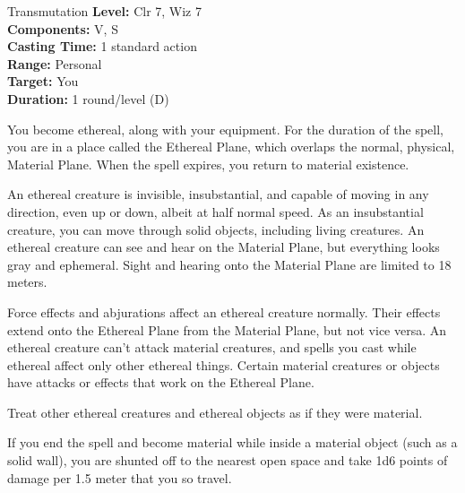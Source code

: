 {Transmutation}
{
	\textbf{Level:}
	Clr 7, Wiz 7\\
	\textbf{Components:}
	V, S\\
	\textbf{Casting Time:}
	1 standard action\\
	\textbf{Range:}
	Personal\\
	\textbf{Target:}
	You\\
	\textbf{Duration:}
	1 round/level (D)\\
}
{
	You become ethereal, along with your equipment. For the duration of the spell, you are in a place called the Ethereal Plane, which overlaps the normal, physical, Material Plane. When the spell expires, you return to material existence.

	An ethereal creature is invisible, insubstantial, and capable of moving in any direction, even up or down, albeit at half normal speed. As an insubstantial creature, you can move through solid objects, including living creatures. An ethereal creature can see and hear on the Material Plane, but everything looks gray and ephemeral. Sight and hearing onto the Material Plane are limited to 18 meters.

	Force effects and abjurations affect an ethereal creature normally. Their effects extend onto the Ethereal Plane from the Material Plane, but not vice versa. An ethereal creature can't attack material creatures, and spells you cast while ethereal affect only other ethereal things. Certain material creatures or objects have attacks or effects that work on the Ethereal Plane.

	Treat other ethereal creatures and ethereal objects as if they were material.

	If you end the spell and become material while inside a material object (such as a solid wall), you are shunted off to the nearest open space and take 1d6 points of damage per 1.5 meter that you so travel.

}
